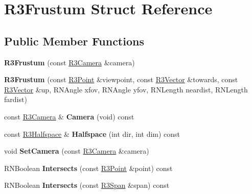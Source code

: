 \hypertarget{struct_r3_frustum}{}\section{R3\+Frustum Struct Reference}
\label{struct_r3_frustum}
\subsection*{Public Member Functions}
\begin{DoxyCompactItemize}
\item 
{\bfseries R3\+Frustum} (const \hyperlink{class_r3_camera}{R3\+Camera} \&camera)\hypertarget{struct_r3_frustum_ad2560ce0693fe855cfe601ed00651701}{}\label{struct_r3_frustum_ad2560ce0693fe855cfe601ed00651701}

\item 
{\bfseries R3\+Frustum} (const \hyperlink{class_r3_point}{R3\+Point} \&viewpoint, const \hyperlink{class_r3_vector}{R3\+Vector} \&towards, const \hyperlink{class_r3_vector}{R3\+Vector} \&up, R\+N\+Angle xfov, R\+N\+Angle yfov, R\+N\+Length neardist, R\+N\+Length fardist)\hypertarget{struct_r3_frustum_aab15ed12f3aef3028427d1cf685c5b23}{}\label{struct_r3_frustum_aab15ed12f3aef3028427d1cf685c5b23}

\item 
const \hyperlink{class_r3_camera}{R3\+Camera} \& {\bfseries Camera} (void) const \hypertarget{struct_r3_frustum_a7a92ddc7b16b5ecf9ed0ca7972d27320}{}\label{struct_r3_frustum_a7a92ddc7b16b5ecf9ed0ca7972d27320}

\item 
const \hyperlink{class_r3_halfspace}{R3\+Halfspace} \& {\bfseries Halfspace} (int dir, int dim) const \hypertarget{struct_r3_frustum_a8383513c86ed5dc77c6ef446db2ddf75}{}\label{struct_r3_frustum_a8383513c86ed5dc77c6ef446db2ddf75}

\item 
void {\bfseries Set\+Camera} (const \hyperlink{class_r3_camera}{R3\+Camera} \&camera)\hypertarget{struct_r3_frustum_a5f950afb6109bf79fd41174844fd6fcb}{}\label{struct_r3_frustum_a5f950afb6109bf79fd41174844fd6fcb}

\item 
R\+N\+Boolean {\bfseries Intersects} (const \hyperlink{class_r3_point}{R3\+Point} \&point) const \hypertarget{struct_r3_frustum_a3ba00858b6906f6b4b5aa17a6307f32d}{}\label{struct_r3_frustum_a3ba00858b6906f6b4b5aa17a6307f32d}

\item 
R\+N\+Boolean {\bfseries Intersects} (const \hyperlink{class_r3_span}{R3\+Span} \&span) const \hypertarget{struct_r3_frustum_a706e0b3936b5f8c59001f101b11531c2}{}\label{struct_r3_frustum_a706e0b3936b5f8c59001f101b11531c2}


\end{DoxyCompactItemize}

